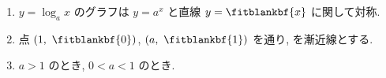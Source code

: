 \documentclass[14pt,dvipdfmx]{jsarticle}
\begin{document}
\begin{summarybox}
  \begin{enumerate}[label=\textbf{\arabic*}, leftmargin=1.5zw, itemsep=0.08em]
    \item $y=\log_{a} x$ のグラフは $y=a^{x}$ と直線 $y=\fitblankbf{x}$ に関して対称.
    \item 点 $(1,\ \fitblankbf{0})$, $(a,\ \fitblankbf{1})$ を通り, を漸近線とする.
    \item $a>1$ のとき, $0<a<1$ のとき.
  \end{enumerate}
\end{summarybox}

\vfill
{}
\end{document}

